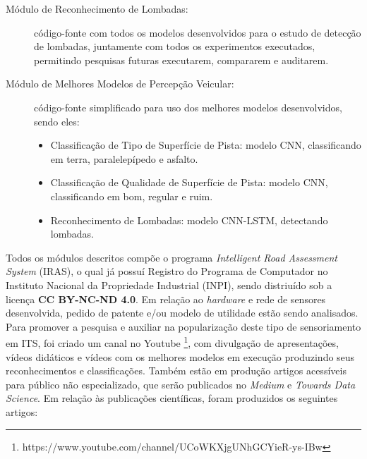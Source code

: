 \begin{small}
\begin{description}
    \item[Módulo de Reconhecimento de Lombadas:] código-fonte com todos os modelos desenvolvidos para o estudo de detecção de lombadas, juntamente com todos os experimentos executados, permitindo pesquisas futuras executarem, compararem e auditarem.
    
    \item[Módulo de Melhores Modelos de Percepção Veicular:] código-fonte simplificado para uso dos melhores modelos desenvolvidos, sendo eles:
    \begin{itemize}
        \item Classificação de Tipo de Superfície de Pista: modelo CNN, classificando em terra, paralelepípedo e asfalto.
        \item Classificação de Qualidade de Superfície de Pista: modelo CNN, classificando em bom, regular e ruim.
        \item Reconhecimento de Lombadas: modelo CNN-LSTM, detectando lombadas.
    \end{itemize}

\end{description}
\end{small}

Todos os módulos descritos compõe o programa \textit{Intelligent Road Assessment System} (IRAS), o qual já possuí Registro do Programa de Computador no Instituto Nacional da Propriedade Industrial (INPI), sendo distriuído sob a licença \textbf{CC BY-NC-ND 4.0}. Em relação ao \textit{hardware} e rede de sensores desenvolvida, pedido de patente e/ou modelo de utilidade estão sendo analisados. Para promover a pesquisa e auxiliar na popularização deste tipo de sensoriamento em ITS, foi criado um canal no Youtube \footnote{https://www.youtube.com/channel/UCoWKXjgUNhGCYieR-ys-IBw}, com divulgação de apresentações, vídeos didáticos e vídeos com os melhores modelos em execução produzindo seus reconhecimentos e classificações. Também estão em produção artigos acessíveis para público não especializado, que serão publicados no \textit{Medium} e \textit{Towards Data Science}. Em relação às publicações científicas, foram produzidos os seguintes artigos: 


